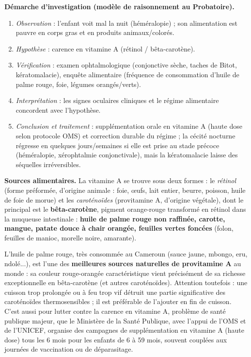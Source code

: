 \documentclass[11pt]{article}
\begin{document}
\textbf{Démarche d'investigation (modèle de raisonnement au Probatoire).}
\begin{enumerate}
\item \emph{Observation} : l'enfant voit mal la nuit (héméralopie) ; son alimentation est pauvre en corps gras et en produits animaux/colorés.
\item \emph{Hypothèse} : carence en vitamine A (rétinol / bêta-carotène).
\item \emph{Vérification} : examen ophtalmologique (conjonctive sèche, taches de Bitot, kératomalacie), enquête alimentaire (fréquence de consommation d'huile de palme rouge, foie, légumes orangés/verts).
\item \emph{Interprétation} : les signes oculaires cliniques et le régime alimentaire concordent avec l'hypothèse.
\item \emph{Conclusion et traitement} : supplémentation orale en vitamine A (haute dose selon protocole OMS) et correction durable du régime ; la cécité nocturne régresse en quelques jours/semaines si elle est prise au stade précoce (héméralopie, xérophtalmie conjonctivale), mais la kératomalacie laisse des séquelles irréversibles.
\end{enumerate}

\textbf{Sources alimentaires.} La vitamine A se trouve sous deux formes : le \emph{rétinol} (forme préformée, d'origine animale : foie, œufs, lait entier, beurre, poisson, huile de foie de morue) et les \emph{caroténoïdes} (provitamine A, d'origine végétale), dont le principal est le \textbf{bêta-carotène}, pigment orange-rouge transformé en rétinol dans la muqueuse intestinale : \textbf{huile de palme rouge non raffinée, carotte, mangue, patate douce à chair orangée, feuilles vertes foncées} (folon, feuilles de manioc, morelle noire, amarante).

\begin{savaistu}
L'huile de palme rouge, très consommée au Cameroun (sauce jaune, mbongo, eru, ndolé...), est l'une des \textbf{meilleures sources naturelles de provitamine A} au monde : sa couleur rouge-orangée caractéristique vient précisément de sa richesse exceptionnelle en bêta-carotène (et autres caroténoïdes). Attention toutefois : une cuisson trop prolongée ou à feu trop vif détruit une partie significative des caroténoïdes thermosensibles ; il est préférable de l'ajouter en fin de cuisson. C'est aussi pour lutter contre la carence en vitamine A, problème de santé publique majeur, que le Ministère de la Santé Publique, avec l'appui de l'OMS et de l'UNICEF, organise des campagnes de supplémentation en vitamine A (haute dose) tous les 6 mois pour les enfants de 6 à 59 mois, souvent couplées aux journées de vaccination ou de déparasitage.
\end{savaistu}
\end{document}
